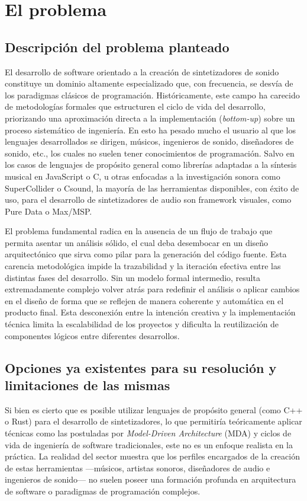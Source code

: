 \chapter{El problema}


\section{Descripción del problema planteado}

El desarrollo de software orientado a la creación de sintetizadores de sonido constituye un dominio altamente especializado que, con frecuencia, se desvía de los paradigmas clásicos de programación. Históricamente, este campo ha carecido de metodologías formales que estructuren el ciclo de vida del desarrollo, priorizando una aproximación directa a la implementación (\textit{bottom-up}) sobre un proceso sistemático de ingeniería. En esto ha pesado mucho el usuario al que los lenguajes desarrollados se dirigen, músicos, ingenieros de sonido, diseñadores de sonido, etc., los cuales no suelen tener conocimientos de programación. Salvo en los casos de lenguajes de propósito general como librerías adaptadas a la síntesis musical en JavaScript o C, u otras enfocadas a la investigación sonora como SuperCollider o Csound, la mayoría de las herramientas disponibles, con éxito de uso, para el desarrollo de sintetizadores de audio son framework visuales, como Pure Data o Max/MSP.

El problema fundamental radica en la ausencia de un flujo de trabajo que permita asentar un análisis sólido, el cual deba desembocar en un diseño arquitectónico que sirva como pilar para la generación del código fuente. Esta carencia metodológica impide la trazabilidad y la iteración efectiva entre las distintas fases del desarrollo. Sin un modelo formal intermedio, resulta extremadamente complejo volver atrás para redefinir el análisis o aplicar cambios en el diseño de forma que se reflejen de manera coherente y automática en el producto final. Esta desconexión entre la intención creativa y la implementación técnica limita la escalabilidad de los proyectos y dificulta la reutilización de componentes lógicos entre diferentes desarrollos.


\section{Opciones ya existentes para su resolución y limitaciones de las mismas}

Si bien es cierto que es posible utilizar lenguajes de propósito general (como C++ o Rust) para el desarrollo de sintetizadores, lo que permitiría teóricamente aplicar técnicas como las postuladas por \textit{Model-Driven Architecture} (MDA) y ciclos de vida de ingeniería de software tradicionales, este no es un enfoque realista en la práctica. La realidad del sector muestra que los perfiles encargados de la creación de estas herramientas —músicos, artistas sonoros, diseñadores de audio e ingenieros de sonido— no suelen poseer una formación profunda en arquitectura de software o paradigmas de programación complejos. 

